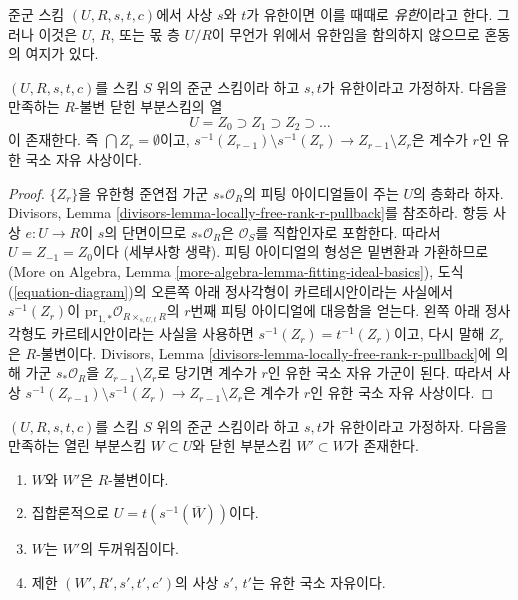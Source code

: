 \noindent
준군 스킴 $(U, R, s, t, c)$에서 사상 $s$와 $t$가 유한이면 이를 때때로
{\it 유한}이라고 한다. 그러나 이것은 $U$, $R$, 또는 몫 층 $U/R$이
무언가 위에서 유한임을 함의하지 않으므로 혼동의 여지가 있다.

\begin{lemma}
\label{lemma-finite-stratify}
$(U, R, s, t, c)$를 스킴 $S$ 위의 준군 스킴이라 하고 $s, t$가
유한이라고 가정하자. 다음을 만족하는 $R$-불변 닫힌 부분스킴의 열
$$
U = Z_0 \supset Z_1 \supset Z_2 \supset \ldots
$$
이 존재한다. 즉 $\bigcap Z_r = \emptyset$이고,
$s^{-1}(Z_{r - 1}) \setminus s^{-1}(Z_r) \to Z_{r - 1} \setminus Z_r$은
계수가 $r$인 유한 국소 자유 사상이다.
\end{lemma}

\begin{proof}
$\{Z_r\}$을 유한형 준연접 가군 $s_*\mathcal{O}_R$의 피팅 아이디얼들이
주는 $U$의 층화라 하자. Divisors, Lemma
\ref{divisors-lemma-locally-free-rank-r-pullback}를 참조하라. 항등 사상
$e : U \to R$이 $s$의 단면이므로 $s_*\mathcal{O}_R$은
$\mathcal{O}_S$를 직합인자로 포함한다. 따라서 $U = Z_{-1} = Z_0$이다
(세부사항 생략). 피팅 아이디얼의 형성은 밑변환과 가환하므로(More on Algebra,
Lemma \ref{more-algebra-lemma-fitting-ideal-basics}), 도식
(\ref{equation-diagram})의 오른쪽 아래 정사각형이 카르테시안이라는 사실에서
$s^{-1}(Z_r)$이 $\text{pr}_{1, *}\mathcal{O}_{R \times_{s, U, t} R}$의
$r$번째 피팅 아이디얼에 대응함을 얻는다. 왼쪽 아래 정사각형도 카르테시안이라는
사실을 사용하면 $s^{-1}(Z_r) = t^{-1}(Z_r)$이고, 다시 말해 $Z_r$은
$R$-불변이다. Divisors, Lemma
\ref{divisors-lemma-locally-free-rank-r-pullback}에 의해 가군
$s_*\mathcal{O}_R$을 $Z_{r - 1} \setminus Z_r$로 당기면 계수가 $r$인
유한 국소 자유 가군이 된다. 따라서 사상
$s^{-1}(Z_{r - 1}) \setminus s^{-1}(Z_r) \to Z_{r - 1} \setminus Z_r$은
계수가 $r$인 유한 국소 자유 사상이다.
\end{proof}

\begin{lemma}
\label{lemma-finite-flat-over-almost-dense-subscheme}
$(U, R, s, t, c)$를 스킴 $S$ 위의 준군 스킴이라 하고 $s, t$가
유한이라고 가정하자. 다음을 만족하는 열린 부분스킴 $W \subset U$와
닫힌 부분스킴 $W' \subset W$가 존재한다.
\begin{enumerate}
\item $W$와 $W'$은 $R$-불변이다.
\item 집합론적으로 $U = t(s^{-1}(\overline{W}))$이다.
\item $W$는 $W'$의 두꺼워짐이다.
\item 제한 $(W', R', s', t', c')$의 사상 $s'$, $t'$는 유한 국소 자유이다.
\end{enumerate}
\end{lemma}

